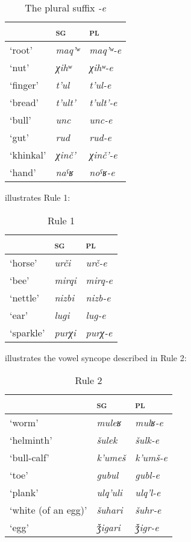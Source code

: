 ﻿\documentclass[output=paper]{langsci/langscibook}
\begin{document}
\begin{table}[h]
  \caption{The plural suffix \emph{-e}}
\begin{tabular}{@{}lll@{}}
\toprule
& \textsc{sg} & \textsc{pl}\tabularnewline\midrule
`root' & \emph{maq'ʷ} & \emph{maq'ʷ-e}\tabularnewline
`nut' & \emph{χihʷ} & \emph{χihʷ-e}\tabularnewline
`finger' & \emph{t'ul} & \emph{t'ul-e}\tabularnewline
`bread' & \emph{t'ult'} & \emph{t'ult'-e}\tabularnewline
`bull' & \emph{unc} & \emph{unc-e}\tabularnewline
`gut' & \emph{rud} & \emph{rud-e}\tabularnewline
`khinkal' & \emph{χinč'} & \emph{χinč'-e}\tabularnewline
`hand' & \emph{naˤʁ} & \emph{noˤʁ-e}\footnotemark
\tabularnewline
\bottomrule
\end{tabular}
\end{table}


 illustrates Rule 1:

\begin{table}[H]
  \caption{Rule 1}\label{tab:3:24}
\begin{tabular}{@{}lll@{}}
\toprule
& \textsc{sg} & \textsc{pl}\tabularnewline \midrule
`horse' & \emph{urči} & \emph{urč-e}\tabularnewline
`bee' & \emph{mirqi} & \emph{mirq-e}\tabularnewline
`nettle' & \emph{nizbi} & \emph{nizb-e}\tabularnewline
`ear' & \emph{lugi} & \emph{lug-e}\tabularnewline
`sparkle' & \emph{purχi} & \emph{purχ-e}\tabularnewline
\bottomrule
\end{tabular}
\vspace{-\jot}
\end{table}


\pagebreak[4]

 illustrates the vowel syncope described in Rule 2:

\begin{table}[H]
  \caption{Rule 2}\label{tab:3:25}
\begin{tabular}{@{}lll@{}}
\toprule
& \textsc{sg} & \textsc{pl}\tabularnewline\midrule
`worm' & \emph{muleʁ} & \emph{mulʁ-e}\tabularnewline
`helminth' & \emph{šulek} & \emph{šulk-e}\tabularnewline
`bull-calf' & \emph{k'umeš} & \emph{k'umš-e}\tabularnewline
`toe' & \emph{gubul} & \emph{gubl-e}\tabularnewline
`plank' & \emph{ulq'uli} & \emph{ulq'l-e}\tabularnewline
`white (of an egg)' & \emph{šuhari} & \emph{šuhr-e}\tabularnewline
`egg' & \emph{ǯigari} & \emph{ǯigr-e}\tabularnewline
\bottomrule
\end{tabular}
\end{table}
\end{document}
